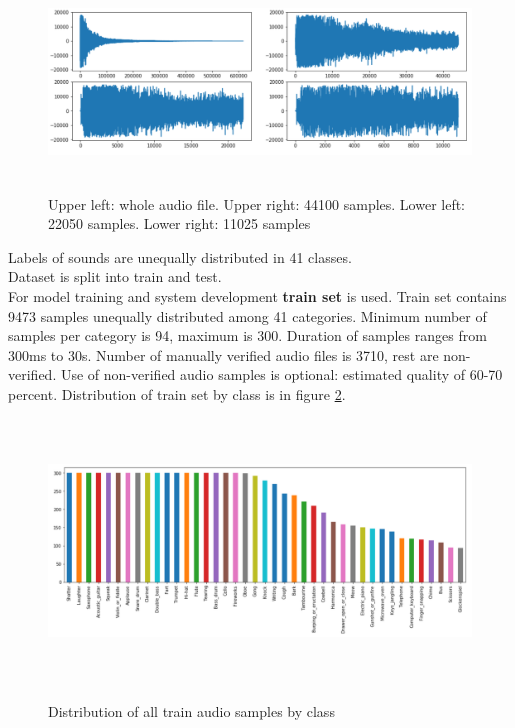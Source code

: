 \documentclass{article}
\begin{document}
\begin{figure}[!htb]
\includegraphics[width=15cm, height=5cm]{sampleBar}\\
\caption{Upper left: whole audio file. Upper right: 44100 samples. Lower left: 22050 samples. Lower right: 11025 samples}
\label{fig:sampleBar}
\centering
\end{figure}

Labels of sounds are unequally distributed in 41 classes.\\
Dataset is split into train and test.\\
For model training and system development \textbf{train set} is used. Train set contains 9473 samples unequally
distributed among 41 categories. Minimum number of samples per category is 94, maximum is 300. Duration
of samples ranges from 300ms to 30s. Number of manually verified audio files is 3710, rest are non-verified.
Use of non-verified audio samples is optional: estimated quality of 60-70 percent. Distribution of train
set by class is in figure \ref{fig:distrAudioSampl}.\\

\begin{figure}[!htb]
\includegraphics[width=15cm, height=7cm]{distrAudioSampl}\\
\caption{Distribution of all train audio samples by class}
\label{fig:distrAudioSampl}
\centering
\end{figure}
\end{document}
